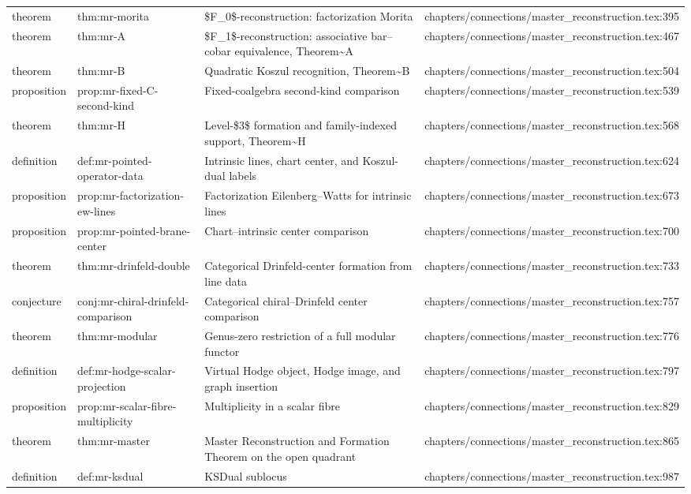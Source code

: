 \documentclass[11pt]{article}
\begin{document}
\begin{longtable}{L{0.10\textwidth}L{0.26\textwidth}L{0.42\textwidth}L{0.22\textwidth}}
theorem & thm:mr-morita & \$F\_0\$-reconstruction: factorization Morita & chapters/connections/master\_reconstruction.tex:395\\
theorem & thm:mr-A & \$F\_1\$-reconstruction: associative bar--cobar equivalence, Theorem\textasciitilde{}A & chapters/connections/master\_reconstruction.tex:467\\
theorem & thm:mr-B & Quadratic Koszul recognition, Theorem\textasciitilde{}B & chapters/connections/master\_reconstruction.tex:504\\
proposition & prop:mr-fixed-C-second-kind & Fixed-coalgebra second-kind comparison & chapters/connections/master\_reconstruction.tex:539\\
theorem & thm:mr-H & Level-\$3\$ formation and family-indexed support, Theorem\textasciitilde{}H & chapters/connections/master\_reconstruction.tex:568\\
definition & def:mr-pointed-operator-data & Intrinsic lines, chart center, and Koszul-dual labels & chapters/connections/master\_reconstruction.tex:624\\
proposition & prop:mr-factorization-ew-lines & Factorization Eilenberg--Watts for intrinsic lines & chapters/connections/master\_reconstruction.tex:673\\
proposition & prop:mr-pointed-brane-center & Chart--intrinsic center comparison & chapters/connections/master\_reconstruction.tex:700\\
theorem & thm:mr-drinfeld-double & Categorical Drinfeld-center formation from line data & chapters/connections/master\_reconstruction.tex:733\\
conjecture & conj:mr-chiral-drinfeld-comparison & Categorical chiral--Drinfeld center comparison & chapters/connections/master\_reconstruction.tex:757\\
theorem & thm:mr-modular & Genus-zero restriction of a full modular functor & chapters/connections/master\_reconstruction.tex:776\\
definition & def:mr-hodge-scalar-projection & Virtual Hodge object, Hodge image, and graph insertion & chapters/connections/master\_reconstruction.tex:797\\
proposition & prop:mr-scalar-fibre-multiplicity & Multiplicity in a scalar fibre & chapters/connections/master\_reconstruction.tex:829\\
theorem & thm:mr-master & Master Reconstruction and Formation Theorem on the op{}en quadrant & chapters/connections/master\_reconstruction.tex:865\\
definition & def:mr-ksdual & KSDual sublocus & chapters/connections/master\_reconstruction.tex:987\\

\end{longtable}
\end{document}
